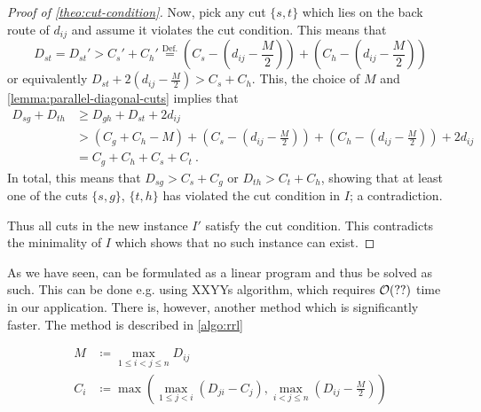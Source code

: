 \begin{proof}[Proof of \cref{theo:cut-condition}]
	Now, pick any cut $\{s, t\}$ which lies on the back route of $d_{ij}$ and assume it violates the cut condition.
	This means that
	\begin{equation}
		D_{st} = D_{st}' > C_s' + C_h' \stackrel{\mathrm{Def.}}{=} \left(C_s - \left(d_{ij} - \frac{M}{2}\right)\right) + \left(C_h - \left(d_{ij} - \frac{M}{2}\right)\right)
	\end{equation}
	or equivalently $D_{st} +  2(d_{ij} - \frac{M}{2}) > C_s + C_h$.
	This, the choice of $M$ and \cref{lemma:parallel-diagonal-cuts} implies that
	\begin{align}
		D_{sg} + D_{th} &\geq D_{gh} + D_{st} + 2 d_{ij}\\
		&> (C_g + C_h - M) +  \left(C_s - \left(d_{ij} - \frac{M}{2}\right)\right) + \left(C_h - \left(d_{ij} - \frac{M}{2}\right)\right) + 2 d_{ij}\\
		&= C_g + C_h + C_s + C_t \ .
	\end{align}
	In total, this means that $D_{sg} > C_s + C_g$ or $D_{th} > C_t + C_h$, showing that at least one of the cuts $\{s, g\}$, $\{t, h\}$ has violated the cut condition in $I$; a contradiction.
	
	Thus all cuts in the new instance $I'$ satisfy the cut condition.
	This contradicts the minimality of $I$ which shows that no such instance can exist.
\end{proof}

As we have seen, \RRL can be formulated as a linear program and thus be solved as such.
This can be done e.g. using XXYYs algorithm, which requires $\mathcal{O}(??)$ time in our application.
There is, however, another method which is significantly faster.
The method is described in \cref{algo:rrl}






\begin{align}
	M &\coloneqq \max_{1 \leq i < j \leq n} D_{ij}\\
	\label{eq:minimal-capacities}
	C_i &\coloneqq \max \left(\max_{1 \leq j < i}(D_{ji} - C_j), \max_{i < j \leq n}(D_{ij} - \frac{M}{2})\right)
\end{align}

